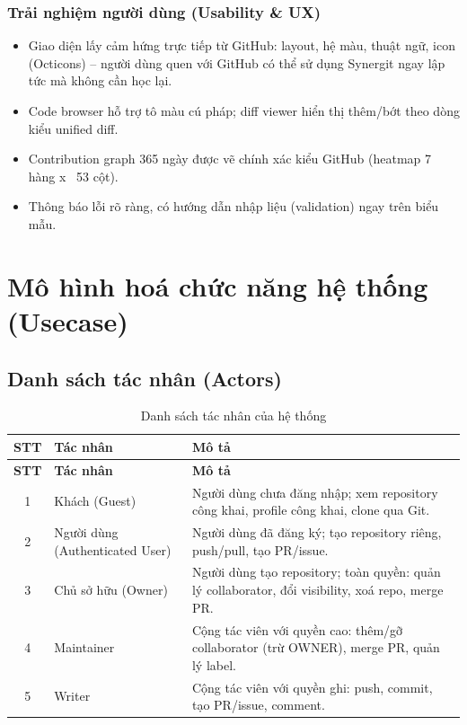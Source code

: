 \subsubsection{Trải nghiệm người dùng (Usability \& UX)}
\begin{itemize}
\item Giao diện lấy cảm hứng trực tiếp từ GitHub: layout, hệ màu, thuật ngữ, icon (Octicons) -- người dùng quen với GitHub có thể sử dụng Synergit ngay lập tức mà không cần học lại.
\item Code browser hỗ trợ tô màu cú pháp; diff viewer hiển thị thêm/bớt theo dòng kiểu unified diff.
\item Contribution graph 365 ngày được vẽ chính xác kiểu GitHub (heatmap 7 hàng x ~53 cột).
\item Thông báo lỗi rõ ràng, có hướng dẫn nhập liệu (validation) ngay trên biểu mẫu.
\end{itemize}

\section{Mô hình hoá chức năng hệ thống (Usecase)}

\subsection{Danh sách tác nhân (Actors)}
\renewcommand{\arraystretch}{1.25}
\begin{longtable}{|c|p{3.6cm}|p{9.3cm}|}
\caption{Danh sách tác nhân của hệ thống}\label{tab:actors}\\
\hline\rowcolor{sgCream}\textbf{STT} & \textbf{Tác nhân} & \textbf{Mô tả}\\\hline\endfirsthead
\hline\rowcolor{sgCream}\textbf{STT} & \textbf{Tác nhân} & \textbf{Mô tả}\\\hline\endhead
1 & Khách (Guest) & Người dùng chưa đăng nhập; xem repository công khai, profile công khai, clone qua Git.\\\hline
2 & Người dùng (Authenticated User) & Người dùng đã đăng ký; tạo repository riêng, push/pull, tạo PR/issue.\\\hline
3 & Chủ sở hữu (Owner) & Người dùng tạo repository; toàn quyền: quản lý collaborator, đổi visibility, xoá repo, merge PR.\\\hline
4 & Maintainer & Cộng tác viên với quyền cao: thêm/gỡ collaborator (trừ OWNER), merge PR, quản lý label.\\\hline
5 & Writer & Cộng tác viên với quyền ghi: push, commit, tạo PR/issue, comment.\\\hline
\end{longtable}

